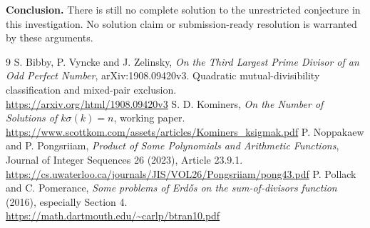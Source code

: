 \documentclass[11pt]{article}
\begin{document}
\textbf{Conclusion.} There is still no complete solution to the unrestricted conjecture in this investigation. No solution claim or submission-ready resolution is warranted by these arguments.

\begin{thebibliography}{9}
 S. Bibby, P. Vyncke and J. Zelinsky, \emph{On the Third Largest Prime Divisor of an Odd Perfect Number}, arXiv:1908.09420v3. Quadratic mutual-divisibility classification and mixed-pair exclusion.\\
\url{https://arxiv.org/html/1908.09420v3}
 S. D. Kominers, \emph{On the Number of Solutions of $k\sigma(k)=n$}, working paper.\\
\url{https://www.scottkom.com/assets/articles/Kominers_ksigmak.pdf}
 P. Noppakaew and P. Pongsriiam, \emph{Product of Some Polynomials and Arithmetic Functions}, Journal of Integer Sequences 26 (2023), Article 23.9.1.\\
\url{https://cs.uwaterloo.ca/journals/JIS/VOL26/Pongsriiam/pong43.pdf}
 P. Pollack and C. Pomerance, \emph{Some problems of Erd\H{o}s on the sum-of-divisors function} (2016), especially Section 4.\\
\url{https://math.dartmouth.edu/~carlp/btran10.pdf}
\end{thebibliography}
\end{document}
